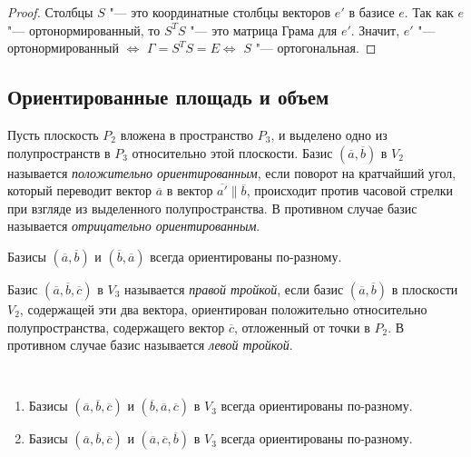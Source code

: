 \begin{proof}
	Столбцы $S$ "--- это координатные столбцы векторов $e'$ в базисе $e$. Так как $e$ "--- ортонормированный, то $S^TS$ "--- это матрица Грама для $e'$. Значит, $e'$ "--- ортонормированный $\Leftrightarrow$ $\Gamma = S^TS = E \Leftrightarrow$ $S$ "--- ортогональная.
\end{proof}

\subsection{Ориентированные площадь и объем}

\begin{definition}
	Пусть плоскость $P_2$ вложена в пространство $P_3$, и выделено одно из полупространств в $P_3$ относительно этой плоскости. Базис $(\overline{a}, \overline{b})$ в $V_2$ называется \textit{положительно ориентированным}, если поворот на кратчайший угол, который переводит вектор $\overline{a}$ в вектор $\overline{a'} \parallel \overline{b}$, происходит против часовой стрелки при взгляде из выделенного полупространства. В противном случае базис называется \textit{отрицательно ориентированным}.
\end{definition}

\begin{note}
	Базисы $(\overline{a}, \overline{b})$ и $(\overline{b}, \overline{a})$ всегда ориентированы по-разному.
\end{note}

\begin{definition}
	Базис $(\overline{a}, \overline{b}, \overline{c})$ в $V_3$ называется \textit{правой тройкой}, если базис $(\overline{a}, \overline{b})$ в плоскости $V_2$, содержащей эти два вектора, ориентирован положительно относительно полупространства, содержащего вектор $\overline{c}$, отложенный от точки в $P_2$. В противном случае базис называется \textit{левой тройкой}.
\end{definition}

\begin{proposition}~
	\begin{enumerate}
		\item Базисы $(\overline{a}, \overline{b}, \overline{c})$ и $(\overline{b}, \overline{a}, \overline{c})$ в $V_3$ всегда ориентированы по-разному.
		\item Базисы $(\overline{a}, \overline{b}, \overline{c})$ и $(\overline{a}, \overline{c}, \overline{b})$ в $V_3$ всегда ориентированы по-разному.
	\end{enumerate}
\end{proposition}

